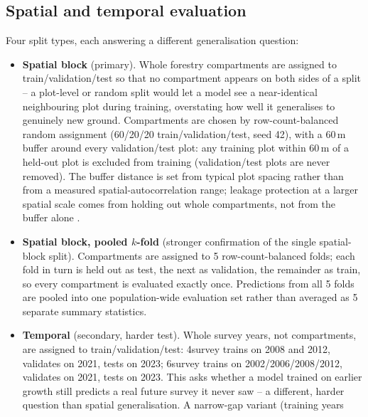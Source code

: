 \subsection{Spatial and temporal evaluation}
\label{sec:splits}

Four split types, each answering a different generalisation question:

\begin{itemize}
\setlength\itemsep{0pt}
\item \textbf{Spatial block} (primary). Whole forestry compartments are assigned to
  train/validation/test so that no compartment appears on both sides of a split -- a plot-level or
  random split would let a model see a near-identical neighbouring plot during training,
  overstating how well it generalises to genuinely new ground. Compartments are chosen by
  row-count-balanced random assignment (60/20/20 train/validation/test, seed 42), with a 60\,m
  buffer around every validation/test plot: any training plot within 60\,m of a held-out plot is
  excluded from training (validation/test plots are never removed). The buffer distance is set
  from typical plot spacing rather than from a measured spatial-autocorrelation range; leakage
  protection at a larger spatial scale comes from holding out whole compartments, not from the
  buffer alone \citep{roberts2017}. %
\item \textbf{Spatial block, pooled $k$-fold} (stronger confirmation of the single spatial-block
  split). Compartments are assigned to 5 row-count-balanced folds; each fold in turn is held out
  as test, the next as validation, the remainder as train, so every compartment is evaluated
  exactly once. Predictions from all 5 folds are pooled into one population-wide evaluation set
  rather than averaged as 5 separate summary statistics.
\item \textbf{Temporal} (secondary, harder test). Whole survey years, not compartments, are
  assigned to train/validation/test: 4survey trains on 2008 and 2012, validates on 2021, tests on
  2023; 6survey trains on 2002/2006/2008/2012, validates on 2021, tests on 2023. This asks whether
  a model trained on earlier growth still predicts a real future survey it never saw -- a
  different, harder question than spatial generalisation. A narrow-gap variant (training years

\end{itemize}
